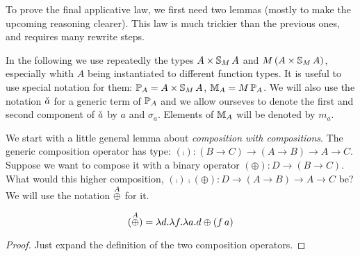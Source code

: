 
To prove the final applicative law, we first need two lemmas (mostly to make the upcoming reasoning clearer). This law is much trickier than the previous ones, and requires many rewrite steps.

In the following we use repeatedly the types $A\times \mathbb{S}_{M}\,A$ and $M\,(A\times \mathbb{S}_{M}\,A)$, especially whith $A$ being instantiated to different function types.
It is useful to use special notation for them:
$\mathbb{P}_{A} = A\times \mathbb{S}_{M}\,A$, $\mathbb{M}_{A} = M\,\mathbb{P}_{A}$.
We will also use the notation $\check{a}$ for a generic term of $\mathbb{P}_{A}$
and we allow ourseves to denote the first and second component of $\check{a}$ by $a$ and $\sigma_a$.
Elements of $\mathbb{M}_{A}$ will be denoted by $m_a$.

We start with a little general lemma about {\em composition with compositions}.
The generic composition operator has type: $(\comp): (B\rightarrow C) \rightarrow (A\rightarrow B) \rightarrow A \rightarrow C$.
Suppose we want to compose it with a binary operator $(\oplus) : D\rightarrow (B\rightarrow C)$.
What would this higher composition, $(\comp) \comp (\oplus) : D \rightarrow (A\rightarrow B) \rightarrow A \rightarrow C$ be?
We will use the notation $\stackrel{A}{\oplus}$ for it.
\begin{lemma}\label{lemma:comp_comp}
$$
(\stackrel{A}{\oplus}) = \lambda d.\lambda f. \lambda a. d\oplus (f\,a)
$$
\end{lemma}
\begin{proof}
Just expand the definition of the two composition operators.
\end{proof}

